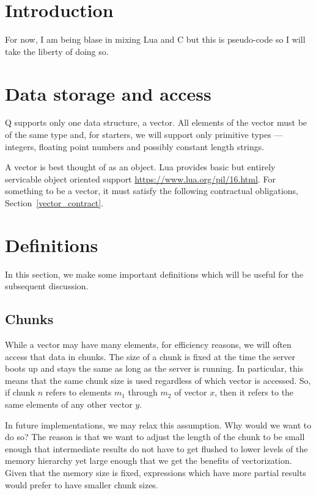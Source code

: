 \newcommand{\Assign}{\verb+:=+ }

\section{Introduction}

For now, I am being blase in mixing Lua and C but this is pseudo-code 
so I will take the liberty of doing so.

\TBC


\section{Data storage and access}

Q supports only one data structure, a vector. All elements of the
vector must be of the same type and, for starters, we will support
only primitive types --- integers, floating point numbers and possibly
constant length strings.

A vector is best thought of as an object. Lua provides basic but
entirely servicable object oriented
support \url{https://www.lua.org/pil/16.html}. For something to be a
vector, it must satisfy the following contractual obligations,
Section~\ref{vector_contract}.

\section{Definitions}
In this section, we make some important definitions which will be useful for the
subsequent discussion. 

\subsection{Chunks}
While a vector may have many elements, for efficiency reasons, we will
often access that data in chunks. The size of a chunk is fixed at the
time the server boots up and stays the same as long as the server is
running. In particular, this means that the same chunk size is used
regardless of which vector is accessed. So, if chunk \(n\) refers to
elements \(m_1\) through \( m_2\) of vector \(x\), then it refers to
the same elements of any other vector \(y\).

In future implementations, we may relax this assumption. Why would we
want to do so? The reason is that we want to adjust the length of the
chunk to be small enough that intermediate results do not have to get
flushed to lower levels of the memory hierarchy yet large enough that
we get the benefits of vectorization.  Given that the memory size is
fixed, expressions which have more partial results would prefer to
have smaller chunk sizes.

